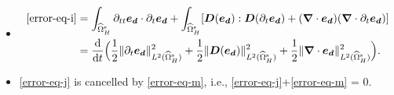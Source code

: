 \documentclass[11pt,reqno]{amsart}
\theoremstyle{definition}
\theoremstyle{plain}
\numberwithin{theorem}{section}
\numberwithin{proposition}{section}
\numberwithin{lemma}{section}
\numberwithin{equation}{section}
\newcommand{\bs}[1]{\boldsymbol{#1}}
\newcommand{\uu}[1]  {{\bs{#1}} }
\newcommand{\dep}{{{\bs{d}}}}
\newcommand{\grad}   { \uu{\nabla}    }
\def\d{\mathrm{d}}
\renewcommand{\(}{\bigl(}
\renewcommand{\)}{\bigr)}
\begin{document}
\begin{itemize}[leftmargin=20pt]
\item
\begin{align}
\eqref{error-eq-i} 
& =  \int_{\widehat{\Omega}^{\rm s}_H} \partial_{tt} {\bs e}_{\dep} \cdot \partial_t{\bs e}_{\dep}
+ \int_{\widehat{\Omega}^{\rm s}_H} [{\bs D}({\bs e}_\dep) : {\bs D}(\partial_t{\bs e}_{\dep}) + (\grad\cdot {\bs e}_\dep)(\grad\cdot\partial_t{\bs e}_{\dep}) ] \notag\\
& = \frac{\d}{\d t}\Big(\frac12 \|\partial_t{\bs e}_{\dep}\|_{L^2(\widehat{\Omega}^{\rm s}_H)}^2 
+ \frac12 \|{\bs D}({\bs e}_\dep)\|_{L^2(\widehat{\Omega}^{\rm s}_H)}^2 + \frac12 \|\grad\cdot{\bs e}_\dep\|_{L^2(\widehat{\Omega}^{\rm s}_H)}^2 \Big) .
\end{align}

\item
\eqref{error-eq-j} is cancelled by \eqref{error-eq-m}, i.e., \eqref{error-eq-j}+\eqref{error-eq-m} = 0.


\end{itemize}
\end{document}
